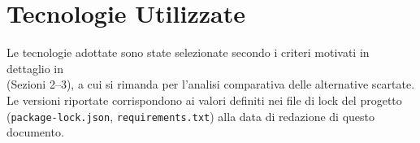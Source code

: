\section{Tecnologie Utilizzate}
Le tecnologie adottate sono state selezionate secondo i criteri motivati in dettaglio in 
\\  (Sezioni 2--3), a cui si rimanda per l'analisi comparativa delle alternative scartate. Le versioni riportate corrispondono ai valori definiti nei file di lock del progetto (\texttt{package-lock.json}, \texttt{requirements.txt}) alla data di redazione di questo documento.

